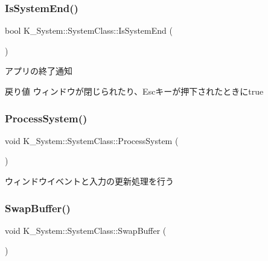 \subsubsection{\texorpdfstring{Is\+System\+End()}{IsSystemEnd()}}
{\footnotesize\ttfamily bool K\+\_\+\+System\+::\+System\+Class\+::\+Is\+System\+End (\begin{DoxyParamCaption}{ }\end{DoxyParamCaption})}



アプリの終了通知 

\begin{DoxyReturn}{戻り値}
ウィンドウが閉じられたり、\+Escキーが押下されたときにtrue 
\end{DoxyReturn}
\mbox{\label{class_k___system_1_1_system_class_a242be8d90313c17762b0013c30cafa47}} 
\subsubsection{\texorpdfstring{Process\+System()}{ProcessSystem()}}
{\footnotesize\ttfamily void K\+\_\+\+System\+::\+System\+Class\+::\+Process\+System (\begin{DoxyParamCaption}{ }\end{DoxyParamCaption})}



ウィンドウイベントと入力の更新処理を行う 

\mbox{\label{class_k___system_1_1_system_class_afe66afc17d7cad5199f4e8a1dd62b472}} 
\subsubsection{\texorpdfstring{Swap\+Buffer()}{SwapBuffer()}}
{\footnotesize\ttfamily void K\+\_\+\+System\+::\+System\+Class\+::\+Swap\+Buffer (\begin{DoxyParamCaption}{ }\end{DoxyParamCaption})}



